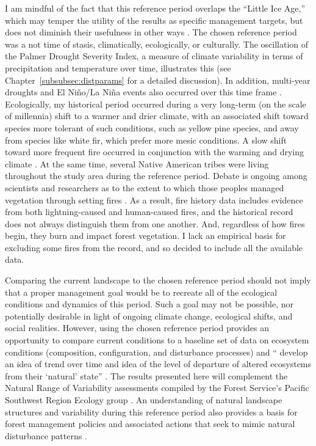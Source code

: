 I am mindful of the fact that this reference period overlaps the ``Little Ice Age,'' which may temper the utility of the results as specific management targets, but does not diminish their usefulness in other ways \citep{Minnich2007,Safford2013}. The chosen reference period was a not time of stasis, climatically, ecologically, or culturally. The oscillation of the Palmer Drought Severity Index, a measure of climate variability in terms of precipitation and temperature over time, illustrates this (see Chapter~\ref{subsubsec:distparams} for a detailed discussion). In addition, multi-year droughts and El Ni\~no/La Ni\~na events also occurred over this time frame \citep{Minnich2007}. Ecologically, my historical period occurred during a very long-term (on the scale of millennia) shift to a warmer and drier climate, with an associated shift toward species more tolerant of such conditions, such as yellow pine species, and away from species like white fir, which prefer more mesic conditions. A slow shift toward more frequent fire occurred in conjunction with the warming and drying climate \citep{Safford2013}. At the same time, several Native American tribes were living throughout the study area during the reference period. Debate is ongoing among scientists and researchers as to the extent to which those peoples managed vegetation through setting fires \citep{Anderson1996}. As a result, fire history data includes evidence from both lightning-caused and human-caused fires, and the historical record does not always distinguish them from one another. And, regardless of how fires begin, they burn and impact forest vegetation. I lack an empirical basis for excluding some fires from the record, and so decided to include all the available data.

Comparing the current landscape to the chosen reference period should not imply that a proper management goal would be to recreate all of the ecological conditions and dynamics of this period. Such a goal may not be possible, nor potentially desirable in light of ongoing climate change, ecological shifts, and social realities. However, using the chosen reference period provides an opportunity to compare current conditions to a baseline set of data on ecosystem conditions (composition, configuration, and disturbance processes) and `` develop an idea of trend over time and idea of the level of departure of altered ecosystems from their `natural' state'' \citep{Safford2013}. The results presented here will complement the Natural Range of Variability assessments compiled by the Forest Service's Pacific Southwest Region Ecology group \citep{Safford2013,Merriam2013,Meyer2013a,Meyer2013,Estes2013,Estes2013a,Gross2013}. An understanding of natural landscape structures and variability during this reference period also provides a basis for forest management policies and associated actions that seek to mimic natural disturbance patterns \citep{Romme2000,Buse2002}. 






